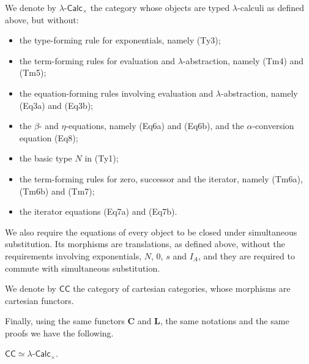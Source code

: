 \begin{definition}\label{idx:lambda-calc-cartesian}
    We denote by $\lambda\text{-}\mathsf{Calc}_\times$ the category whose objects are typed $\lambda$-calculi as defined above, but without:
    \begin{itemize}
        \item the type-forming rule for exponentials, namely (Ty3);
        \item the term-forming rules for evaluation and $\lambda$-abstraction, namely (Tm4) and (Tm5);
        \item the equation-forming rules involving evaluation and $\lambda$-abstraction, namely (Eq3a) and (Eq3b);
        \item the $\beta$- and $\eta$-equations, namely (Eq6a) and (Eq6b), and the $\alpha$-conversion equation (Eq8);
        \item the basic type $N$ in (Ty1);
        \item the term-forming rules for zero, successor and the iterator, namely (Tm6a), (Tm6b) and (Tm7);
        \item the iterator equations (Eq7a) and (Eq7b).
    \end{itemize}
    We also require the equations of every object to be closed under simultaneous substitution.
    Its morphisms are translations, as defined above, without the requirements involving exponentials, $N$, $0$, $s$ and $I_A$, and they are required to commute with simultaneous substitution.
\end{definition}

\begin{notation}\label{idx:cc}
    We denote by $\mathsf{CC}$ the category of cartesian categories, whose morphisms are cartesian functors.
\end{notation}

Finally, using the same functors $\mathbf C$ and $\mathbf L$, the same notations and the same proofs we have the following.

\begin{theorem}\label{thm:curry-howard-lambek-cartesian-categories}
    $\mathsf{CC} \simeq \lambda\text{-}\mathsf{Calc}_\times$.
\end{theorem}
